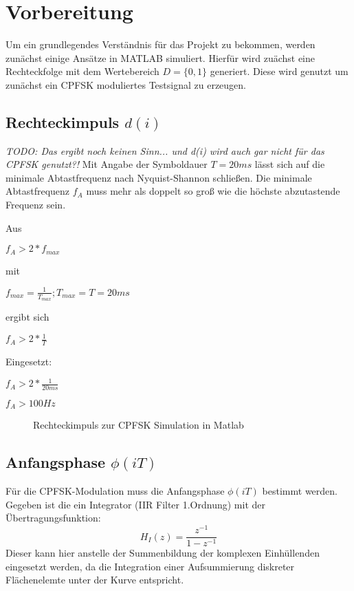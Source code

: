 \documentclass{article}
\begin{document}
\section{Vorbereitung}
Um ein grundlegendes Verständnis für das Projekt zu bekommen, werden zunächst einige Ansätze in MATLAB simuliert.
Hierfür wird zuächst eine Rechteckfolge mit dem Wertebereich $D = \{0,1\}$ generiert. Diese wird genutzt um zunächst ein 
CPFSK moduliertes Testsignal zu erzeugen.

\subsection{Rechteckimpuls $d(i)$}\label{sec:rechteck}
\textit{TODO: Das ergibt noch keinen Sinn... und d(i) wird auch gar nicht für das CPFSK genutzt?!}
Mit Angabe der Symboldauer $T = 20ms$ lässt sich auf die minimale Abtastfrequenz nach Nyquist-Shannon schließen.
Die minimale Abtastfrequenz $f_A$ muss mehr als doppelt so groß wie die höchste abzutastende Frequenz sein.

Aus
\begin{center}
 $
f_A > 2*f_{max}
$
\end{center}

mit 
\begin{center} $f_{max} = \frac{1}{T_{max}} ; T_{max} = T = 20ms$  \end{center}

ergibt sich

\begin{center}
$
f_A > 2*\frac{1}{T}
$
\end{center}

Eingesetzt:
\begin{center}
$f_A > 2*\frac{1}{20ms}$
\end{center}
\begin{center}
$f_A > 100Hz$   
\end{center}
\begin{figure}[!h]
    \centering
    \def\svgscale{0.3}
    \def\svgwidth{\columnwidth}
    \caption{Rechteckimpuls zur \ac{CPFSK} Simulation in Matlab}
\end{figure}

\subsection{Anfangsphase $\phi(iT)$}
Für die CPFSK-Modulation muss die Anfangsphase $\phi(iT)$ bestimmt werden.
Gegeben ist die ein Integrator (IIR Filter 1.Ordnung) mit der Übertragungsfunktion:
$$
H_I(z)=\frac{z^{-1}}{1-z^{-1}}
$$
Dieser kann hier anstelle der Summenbildung der komplexen Einhüllenden eingesetzt werden, 
da die Integration einer Aufsummierung diskreter Flächenelemte unter der Kurve entspricht.
\end{document}
